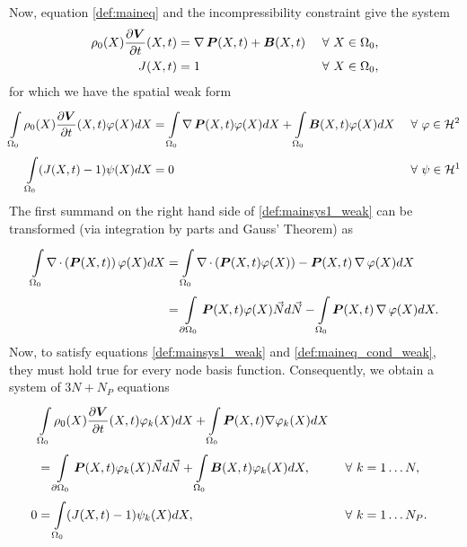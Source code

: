 Now, equation \eqref{def:maineq} and the incompressibility constraint give the system 
\begin{align}
	\rho_0(X)\frac{\partial \boldsymbol{V}}{\partial t}(X,t) &= \operatorname{\nabla}\boldsymbol{P}(X,t) + \boldsymbol{B}(X,t)&& ~\forall~ X\in\Omega_0,\label{def:mainsys1}\\
	J(X,t) &= 1 && ~\forall~ X\in\Omega_0,\label{def:maineq_cond}
\end{align}
for which we have the spatial weak form
\begin{align}
	\int\limits_{\Omega_0}^{}\rho_0(X)\frac{\partial \boldsymbol{V}}{\partial t}(X,t)\varphi(X)dX &= \int\limits_{\Omega_0}^{}\operatorname{\nabla}\boldsymbol{P}(X,t)\varphi(X)dX + \int\limits_{\Omega_0}^{}\boldsymbol{B}(X,t)\varphi(X)dX &&~\forall~ \varphi\in\mathcal{H}^2\label{def:mainsys1_weak}\\
	\int\limits_{\Omega_0}^{} (J(X,t)-1)\psi(X)dX &= 0 && ~\forall~ \psi\in\mathcal{H}^1\label{def:maineq_cond_weak}
\end{align}
The first summand on the right hand side of \eqref{def:mainsys1_weak} can be transformed (via integration by parts and Gauss' Theorem) as
\begin{align*}
	\int\limits_{\Omega_0}^{} \operatorname{\nabla}\cdot\left(\boldsymbol{P}(X,t)\right)\varphi(X) dX &= \int\limits_{\Omega_0}^{} \operatorname{\nabla}\cdot\left(\boldsymbol{P}(X,t)\varphi(X)\right) - \boldsymbol{P}(X,t)\operatorname{\nabla}\varphi(X) dX\\
		 &= \int\limits_{\partial\Omega_0}^{} \boldsymbol{P}(X,t)\varphi(X)\vec{N}d\vec{N} - \int\limits_{\Omega_0}^{} \boldsymbol{P}(X,t)\operatorname{\nabla}\varphi(X)dX.
\end{align*}
Now, to satisfy equations \eqref{def:mainsys1_weak} and \eqref{def:maineq_cond_weak}, they must hold true for every node basis function. 
Consequently, we obtain a system of $3N+N_P$ equations
\begin{align}
	&\int\limits_{\Omega_0}^{} \rho_0(X)\frac{\partial \boldsymbol{V}}{\partial t}(X,t)\varphi_k(X)dX + \int\limits_{\Omega_0}^{}\boldsymbol{P}(X,t)\nabla\varphi_{k}(X) dX\label{def:mainsys1_weak_kparts}\\
	&= \int\limits_{\partial\Omega_0}^{} \boldsymbol{P}(X,t)\varphi_k(X)\vec{N}d\vec{N} + \int\limits_{\Omega_0}^{}\boldsymbol{B}(X,t)\varphi_k(X)dX, && ~\forall~ k=1\ldots N,\nonumber\\
	0 &= \int\limits_{\Omega_0}^{} (J(X,t)-1)\psi_k(X)dX, && ~\forall~ k=1\ldots N_P.\label{def:maineq_cond_weak_kparts}
\end{align}

